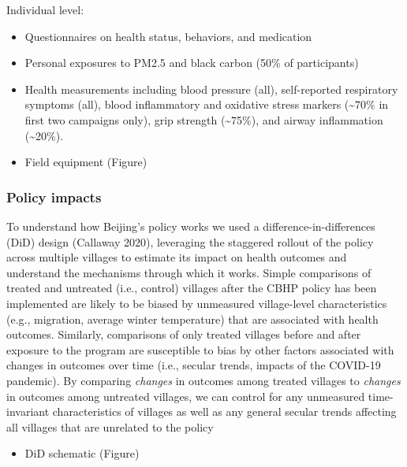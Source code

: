 \documentclass[
  letterpaper,
  DIV=11,
  numbers=noendperiod]{scrartcl}
\providecommand{\tightlist}{%
  \setlength{\itemsep}{0pt}\setlength{\parskip}{0pt}}\usepackage{longtable,booktabs,array}
\begin{document}
Individual level:

\begin{itemize}
\item
  Questionnaires on health status, behaviors, and medication
\item
  Personal exposures to PM2.5 and black carbon (50\% of participants)
\item
  Health measurements including blood pressure (all), self-reported
  respiratory symptoms (all), blood inflammatory and oxidative stress
  markers (\textasciitilde70\% in first two campaigns only), grip
  strength (\textasciitilde75\%), and airway inflammation
  (\textasciitilde20\%).
\item
  Field equipment (Figure)
\end{itemize}

\subsubsection{Policy impacts}\label{policy-impacts}

To understand how Beijing's policy works we used a
difference-in-differences (DiD) design (Callaway 2020), leveraging the
staggered rollout of the policy across multiple villages to estimate its
impact on health outcomes and understand the mechanisms through which it
works. Simple comparisons of treated and untreated (i.e., control)
villages after the CBHP policy has been implemented are likely to be
biased by unmeasured village-level characteristics (e.g., migration,
average winter temperature) that are associated with health outcomes.
Similarly, comparisons of only treated villages before and after
exposure to the program are susceptible to bias by other factors
associated with changes in outcomes over time (i.e., secular trends,
impacts of the COVID-19 pandemic). By comparing \emph{changes} in
outcomes among treated villages to \emph{changes} in outcomes among
untreated villages, we can control for any unmeasured time-invariant
characteristics of villages as well as any general secular trends
affecting all villages that are unrelated to the policy

\begin{itemize}
\tightlist
\item
  DiD schematic (Figure)
\end{itemize}
\end{document}
